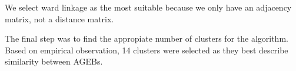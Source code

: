 We select ward linkage as the most suitable because we only have an adjacency matrix, not a distance matrix.

The final step was to find the appropiate number of clusters for the algorithm. Based on empirical observation, 14 clusters were selected as they best describe similarity between AGEBs.



